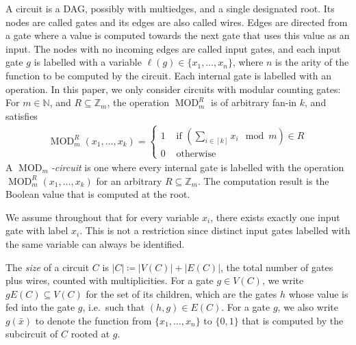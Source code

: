 \documentclass[11pt]{article}
\DeclareMathOperator{\MOD}{MOD}
\newcommand{\bbN}{\mathbb{N}}
\newcommand{\bbZ}{\mathbb{Z}}
\theoremstyle{definition}
\theoremstyle{plain}
\theoremstyle{remark}
\theoremstyle{remark}
\begin{document}
A circuit is a DAG, possibly with multiedges, and a single designated root. Its nodes are called gates and its edges are also called wires. Edges are directed from a gate where a value is computed towards the next gate that uses this value as an input. The nodes with no incoming edges are called input gates, and each input gate $g$ is labelled with a variable $\ell(g) \in \{x_1, \dots, x_n\}$, where $n$ is the arity of the function to be computed by the circuit. Each internal gate is labelled with an operation. In this paper, we only consider circuits with modular counting gates: For $m \in \bbN$, and $R \subseteq \bbZ_m$, the operation $\MOD_m^R$ is of arbitrary fan-in $k$, and satisfies
\begin{align*}
	\MOD_m^R(x_1, \dots, x_k) = \begin{cases}
		1 & \text{ if } (\sum_{i \in [k]} x_i \mod m) \in R\\
		0 & \text{ otherwise}
	\end{cases}
\end{align*}
A \emph{$\MOD_m$-circuit} is one where every internal gate is labelled with the operation $\MOD_m^R(x_1, \dots, x_k)$ for an arbitrary $R \subseteq \bbZ_m$. The computation result is the Boolean value that is computed at the root. 

We assume throughout that for every variable $x_i$, there exists exactly one input gate with label $x_i$. This is not a restriction since distinct input gates labelled with the same variable can always be identified.

The \emph{size} of a circuit $C$ is $|C| \coloneqq |V(C)| + |E(C)|$, the total number of gates plus wires, counted with multiplicities.
For a gate $g \in V(C)$, we write $gE(C) \subseteq V(C)$ for the set of its children, which are the gates $h$ whose value is fed into the gate $g$, i.e.\ such that $(h,g) \in E(C)$. For a gate $g$, we also write $g(\bar{x})$ to denote the function from $\{x_1, \dots, x_n\}$ to $\{0,1\}$ that is computed by the subcircuit of $C$ rooted at $g$.
\end{document}
